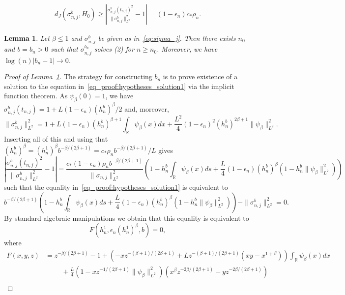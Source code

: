 \documentclass[10pt,a4paper]{amsart}
\newtheorem{lemma}{Lemma}
\newcommand{\R}{\mathbb{R}}
\begin{document}
\begin{align}\label{eq_proof:hypotheses_solution1}
    d_J(\sigma_{n,j}^b,H_0) \geq \left|\frac{\sigma_{n,j}^b(t_{n,j})^2}{\|\sigma_{n,j}^b\|_{L^2}^2} -1\right| = (1-\epsilon_n)c_*\rho_n.
\end{align}  

\begin{lemma}\label{lemma:hypotheses_solution}
    Let $\beta\leq 1$ and $\sigma_{n,j}^b$ be given as in~\eqref{eq:sigma_j}. Then there exists $n_0$ and $b=b_n>0$ such that $\sigma_{n,j}^{b_n}$ solves (2) for $n\geq n_0$. Moreover, we have $\log(n)|b_n-1|\rightarrow 0$.
\end{lemma}

\begin{proof}[Proof of Lemma~\ref{lemma:hypotheses_solution}]
    The strategy for constructing $b_n$ is to prove existence of a solution to the equation in~\eqref{eq_proof:hypotheses_solution1} via the implicit function theorem.
    As $\psi_\beta(0)=1$, we have $\sigma_{n,j}^b(t_{n,j}) = 1+L(1-\epsilon_n)(h_n^b)^\beta/2$ and, moreover,
    \[ \|\sigma_{n,j}^b\|_{L^2}^2 = 1 + L(1-\epsilon_n) (h_n^b)^{\beta+1}\int_\R \psi_\beta(x)dx + \frac{L^2}{4}(1-\epsilon_n)^2 (h_n^b)^{2\beta+1} \|\psi_\beta\|_{L^2}^2.\]
    Inserting all of this and using that $(h_n^b)^\beta = (h_n^1)^\beta b^{-\beta/(2\beta+1)} = c_*\rho_n b^{-\beta/(2\beta+1)}/L$ gives
    \[ \left|\frac{\sigma_{n,j}^b(t_{n,j})^2}{\|\sigma_{n,j}^b\|_{L^2}^2} -1\right| = \frac{c_*(1-\epsilon_n)\rho_n b^{-\beta/(2\beta+1)}}{\|\sigma_{n,j}\|_{L^2}^2} \left( 1- h_n^b\int_\R \psi_\beta(x)ds + \frac{L}{4}(1-\epsilon_n)(h_n^b)^{\beta}\left(1-h_n^b\|\psi_\beta\|_{L^2}^2\right)\right)\]
    such that the equality in~\eqref{eq_proof:hypotheses_solution1} is equivalent to 
    \[ b^{-\beta/(2\beta+1)}\left( 1- h_n^b\int_\R \psi_\beta(x)ds + \frac{L}{4}(1-\epsilon_n)(h_n^b)^{\beta}\left( 1-h_n^b\|\psi_\beta\|_{L^2}^2\right)\right) - \|\sigma_{n,j}^b\|_{L^2}^2 =0.\]
    By standard algebraic manipulations we obtain that this equality is equivalent to
    \[ F\left(h_n^1,\epsilon_n (h_n^1)^\beta, b \right) =0,\]
    where
    \begin{align*}
        F(x,y,z) &= z^{-\beta/(2\beta+1)} -1 + \left( -xz^{-(\beta+1)/(2\beta+1)} + Lz^{-(\beta+1)/(2\beta+1)} \left(xy-x^{1+\beta}\right) \right) \int_\R \psi_\beta(x)dx \\
        &\hspace{1cm}+ \frac{L}{4}\left( 1-xz^{-1/(2\beta+1)}\|\psi_\beta\|_{L^2}^2\right)\left( x^\beta z^{-2\beta/(2\beta+1)} - yz^{-2\beta/(2\beta+1)}\right)\\

\end{align*}
\end{proof}
\end{document}
